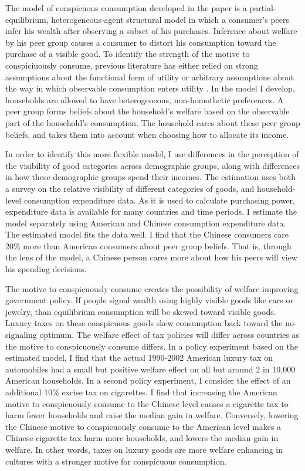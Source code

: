 \documentclass[11pt]{article}
\begin{document}
\begin{CJK}{UTF8}{gbsn}
The model of conspicuous consumption developed in the paper is a partial-equilibrium, heterogeneous-agent structural model in which a consumer's peers infer his wealth after observing a subset of his purchases.  Inference about welfare by his peer group causes a consumer to distort his consumption toward the purchase of a visible good.  To identify the strength of the motive to conspiciuously consume, previous literature has either relied on strong assumptions about the functional form of utility or arbitrary assumptions about the way in which observable consumption enters utility \citep{heffetz2011, perez2013measuring}.  In the model I develop, households are allowed to have heterogeneous, non-homothetic preferences.  A peer group forms beliefs about the household's welfare based on the observable part of the household's consumption.  The household cares about these peer group beliefs, and takes them into account when choosing how to allocate its income.  

In order to identify this more flexible model, I use differences in the perception of the visibility of good categories across demographic groups, along with differences in how these demographic groups spend their incomes. The estimation uses both a survey on the relative visibility of different categories of goods, and household-level consumption expenditure data.  As it is used to calculate purchasing power, expenditure data is available for many countries and time periods.  I estimate the model separately using American and Chinese consumption expenditure data.  The estimated model fits the data well.  I find that the Chinese consumers care 20\% more than American consumers about peer group beliefs.  That is, through the lens of the model, a Chinese person cares more about how his peers will view his spending decisions.

The motive to conspicuously consume creates the possibility of welfare improving government policy.  If people signal wealth using highly visible goods like cars or jewelry, than equilibrium consumption will be skewed toward visible goods.  Luxury taxes on these conspicuous goods skew consumption back toward the no-signaling optimum.  The welfare effect of tax policies will differ across countries as the motive to conspicuously consume differs.  In a policy experiment based on the estimated model, I find that the actual 1990-2002 American luxury tax on automobiles had a small but positive welfare effect on all but around 2 in 10,000 American households.  In a second policy experiment, I consider the effect of an additional 10\% excise tax on cigarettes.  I find that increasing the American motive to conspicuously consume to the Chinese level causes a cigarette tax to harm fewer households and raise the median gain in welfare.  Conversely, lowering the Chinese motive to conspicuously consume to the American level makes a Chinese cigarette tax harm more households, and lowers the median gain in welfare.  In other words, taxes on luxury goods are more welfare enhancing in cultures with a stronger motive for conspicuous consumption.


\end{CJK}
\end{document}
